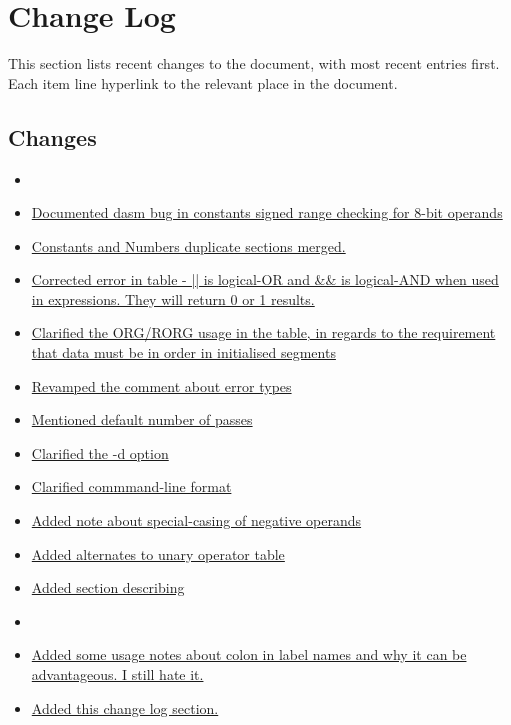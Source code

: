 \section*{Change Log}
\label{section:changelog}

This section lists recent changes to the document, with most recent entries first. Each item line hyperlink to the relevant place in the document.

\subsection*{Changes}

\begin{itemize}

\item[]
\item \hyperref[changelog:rangebug]{Documented dasm bug in constants signed range checking for 8-bit operands}
\item \hyperref[changelog:20200824const]{Constants and Numbers duplicate sections merged.}
\item \hyperref[changelog:20200824arithmetic]{Corrected error in table - || is logical-OR and \&\& is logical-AND when used in expressions. They will return 0 or 1 results.}
\item \hyperref[changelog:20200824org]{Clarified the ORG/RORG usage in the  table, in regards to the requirement that data must be in order in initialised segments}
\item \hyperref[changelog:20200824error]{Revamped the comment about error types}
\item \hyperref[changelog:20200824passes]{Mentioned default number of passes}
\item \hyperref[changelog:20200824developers]{Clarified the -d option}
\item \hyperref[changelog:20200824sourcefile]{Clarified commmand-line format}
\item \hyperref[changelog:specialcase]{Added note about special-casing of negative operands}
\item \hyperref[changelog:alternateunary]{Added alternates to unary operator table}
\item \hyperref[section:numberformat]{Added section describing }

\item[]
\item \hyperref[changelog:20200823colon]{Added some usage notes about colon in label names and why it can be advantageous. I still hate it.}
\item \hyperref[section:changelog]{Added this change log section.}
\end{itemize}


